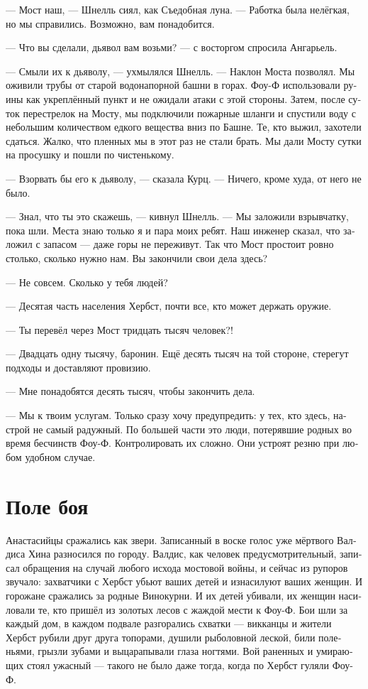 \documentclass[a4paper,12pt,fleqn]{book}\usepackage{polyglossia}\setdefaultlanguage[babelshorthands=true]{russian}\setotherlanguage{english}\defaultfontfeatures{Ligatures=TeX,Mapping=tex-text}\usepackage{xcolor}\newcommand{\ml}[3]{#2}
\begin{document}
--- Мост наш, --- Шнелль сиял, как Съедобная луна.
--- Работка была нелёгкая, но мы справились.
Возможно, вам понадобится.

--- Что вы сделали, дьявол вам возьми? --- с восторгом спросила Ангарьель.

--- Смыли их к дьяволу, --- ухмылялся Шнелль.
--- Наклон Моста позволял.
Мы оживили трубы от старой водонапорной башни в горах.
Фоу-Ф использовали руины как укреплённый пункт и не ожидали атаки с этой стороны.
Затем, после суток перестрелок на Мосту, мы подключили пожарные шланги и спустили воду с небольшим количеством едкого вещества вниз по Башне.
Те, кто выжил, захотели сдаться.
Жалко, что пленных мы в этот раз не стали брать.
Мы дали Мосту сутки на просушку и пошли по чистенькому.

--- Взорвать бы его к дьяволу, --- сказала Курц.
--- Ничего, кроме худа, от него не было.

--- Знал, что ты это скажешь, --- кивнул Шнелль.
--- Мы заложили взрывчатку, пока шли.
Места знаю только я и пара моих ребят.
Наш инженер сказал, что заложил с запасом --- даже горы не переживут.
Так что Мост простоит ровно столько, сколько нужно нам.
Вы закончили свои дела здесь?

--- Не совсем.
Сколько у тебя людей?

--- Десятая часть населения Хербст, почти все, кто может держать оружие.

--- Ты перевёл через Мост тридцать тысяч человек?!

--- Двадцать одну тысячу, баронин.
Ещё десять тысяч на той стороне, стерегут подходы и доставляют провизию.

--- Мне понадобятся десять тысяч, чтобы закончить дела.

--- Мы к твоим услугам.
Только сразу хочу предупредить: у тех, кто здесь, настрой не самый радужный.
По большей части это люди, потерявшие родных во время бесчинств Фоу-Ф.
Контролировать их сложно.
Они устроят резню при любом удобном случае.

\section{Поле боя}

Анастасийцы сражались как звери.
Записанный в воске голос уже мёртвого Валдиса Хина разносился по городу.
Валдис, как человек предусмотрительный, записал обращения на случай любого исхода мостовой войны, и сейчас из рупоров звучало: захватчики с Хербст убьют ваших детей и изнасилуют ваших женщин.
И горожане сражались за родные Винокурни.
И их детей убивали, их женщин насиловали те, кто пришёл из золотых лесов с жаждой мести к Фоу-Ф.
Бои шли за каждый дом, в каждом подвале разгорались схватки --- викканцы и жители Хербст рубили друг друга топорами, душили рыболовной леской, били поленьями, грызли зубами и выцарапывали глаза ногтями.
Вой раненных и умирающих стоял ужасный --- такого не было даже тогда, когда по Хербст гуляли Фоу-Ф.
\end{document}
